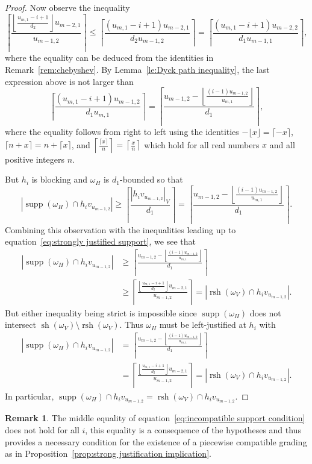 \documentclass[10pt]{amsart}
\theoremstyle{definition}
\newtheorem{remark}[theorem]{Remark}
\DeclareMathOperator{\supp}{supp}
\DeclareMathOperator{\rsh}{rsh}
\DeclareMathOperator{\sh}{sh}
\begin{document}
\begin{proof}
 Now observe the inequality 
 \[\left\lceil\frac{\left\lfloor\frac{u_{m,1}-i+1}{d_2}\right\rfloor u_{m-2,1}}{u_{m-1,2}}\right\rceil\le\left\lceil\frac{(u_{m,1}-i+1)u_{m-2,1}}{d_2u_{m-1,2}}\right\rceil=\left\lceil\frac{(u_{m,1}-i+1)u_{m-2,2}}{d_1u_{m-1,1}}\right\rceil,\] 
 where the equality can be deduced from the identities in Remark~\ref{rem:chebyshev}.
 By Lemma~\ref{le:Dyck path inequality}, the last expression above is not larger than 
 \begin{equation}
 \label{eq:strongly justified support}
 \left\lceil\frac{(u_{m,1}-i+1)u_{m-1,2}}{d_1u_{m,1}}\right\rceil=\left\lceil\frac{u_{m-1,2}-\left\lfloor\frac{(i-1)u_{m-1,2}}{u_{m,1}}\right\rfloor}{d_1}\right\rceil,
 \end{equation}
 where the equality follows from right to left using the identities $-\lfloor x\rfloor=\lceil-x\rceil$, $\lceil n+x\rceil=n+\lceil x\rceil$, and $\left\lceil\frac{\lceil x\rceil}{n}\right\rceil=\left\lceil\frac{x}{n}\right\rceil$ which hold for all real numbers $x$ and all positive integers $n$.
 
 But $h_i$ is blocking and $\omega_H$ is $d_1$-bounded so that
 \[|\supp(\omega_H)\cap h_iv_{u_{m-1,2}}|\ge\left\lceil\frac{|h_iv_{u_{m-1,2}}|_V}{d_1}\right\rceil=\left\lceil\frac{u_{m-1,2}-\left\lfloor\frac{(i-1)u_{m-1,2}}{u_{m,1}}\right\rfloor}{d_1}\right\rceil.\]
 Combining this observation with the inequalities leading up to equation~\eqref{eq:strongly justified support}, we see that
 \begin{align*}
 |\supp(\omega_H)\cap h_iv_{u_{m-1,2}}|
 &\ge\left\lceil\frac{u_{m-1,2}-\left\lfloor\frac{(i-1)u_{m-1,2}}{u_{m,1}}\right\rfloor}{d_1}\right\rceil\\
 &\ge\left\lceil\frac{\left\lfloor\frac{u_{m,1}-i+1}{d_2}\right\rfloor u_{m-2,1}}{u_{m-1,2}}\right\rceil=|\rsh(\omega_V)\cap h_iv_{u_{m-1,2}}|.
 \end{align*}
 But either inequality being strict is impossible since $\supp(\omega_H)$ does not intersect $\sh(\omega_V)\setminus\rsh(\omega_V)$. 
 Thus $\omega_H$ must be left-justified at $h_i$ with 
 \begin{align}
 \label{eq:incompatible support condition}
 |\supp(\omega_H)\cap h_iv_{u_{m-1,2}}|
 &=\left\lceil\frac{u_{m-1,2}-\left\lfloor\frac{(i-1)u_{m-1,2}}{u_{m,1}}\right\rfloor}{d_1}\right\rceil\\
 \nonumber &=\left\lceil\frac{\left\lfloor\frac{u_{m,1}-i+1}{d_2}\right\rfloor u_{m-2,1}}{u_{m-1,2}}\right\rceil=|\rsh(\omega_V)\cap h_iv_{u_{m-1,2}}|.
 \end{align}
 In particular, $\supp(\omega_H)\cap h_iv_{u_{m-1,2}}=\rsh(\omega_V)\cap h_iv_{u_{m-1,2}}$.
\end{proof}
\begin{remark}
 The middle equality of equation~\eqref{eq:incompatible support condition} does not hold for all $i$, this equality is a consequence of the hypotheses and thus provides a necessary condition for the existence of a piecewise compatible grading as in Proposition~\ref{prop:strong justification implication}.
\end{remark} 
\end{document}
